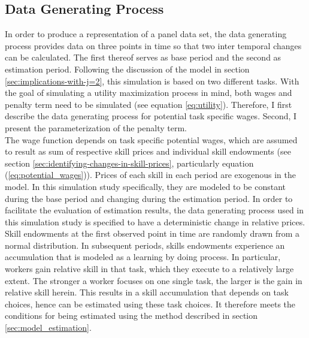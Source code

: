 \documentclass[../main.tex]{subfiles}
\begin{document}
\subsection{Data Generating Process} \label{sec:DGP}
In order to produce a representation of a panel data set, the data generating process provides data on three points in time so that two inter temporal changes can be calculated. The first thereof serves as base period and the second as estimation period. Following the discussion of the model in section \ref{sec:implications-with-j=2}, this simulation is based on two different tasks. With the goal of simulating a utility maximization process in mind, both wages and penalty term need to be simulated (see equation \ref{eq:utility}). Therefore, I first describe the data generating process for potential task specific wages. Second, I present the parameterization of the penalty term.
\\
The wage function depends on task specific potential wages, which are assumed to result as sum of respective skill prices and individual skill endowments (see section \ref{sec:identifying-changes-in-skill-prices}, particularly equation (\ref{eq:potential_wages})). Prices of each skill in each period are exogenous in the model. In this simulation study specifically, they are modeled to be constant during the base period and changing during the estimation period. In order to facilitate the evaluation of estimation results, the data generating process used in this simulation study is specified to have a deterministic change in relative prices.
\\
Skill endowments at the first observed point in time are randomly drawn from a normal distribution. In subsequent periods, skills endowments experience an accumulation that is modeled as a learning by doing process. In particular, workers gain relative skill in that task, which they execute to a relatively large extent. The stronger a worker focuses on one single task, the larger is the gain in relative skill herein. This results in a skill accumulation that depends on task choices, hence can be estimated using these task choices. It therefore meets the conditions for being estimated using the method described in section \ref{sec:model_estimation}.
\end{document}
